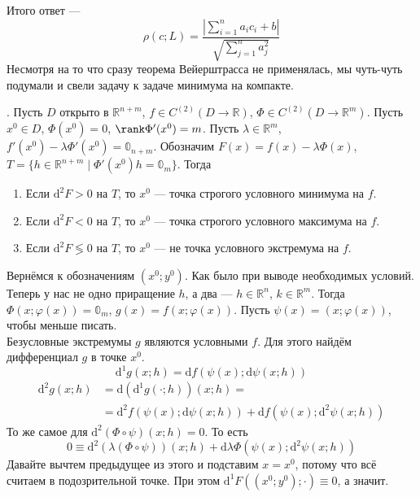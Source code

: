 \documentclass{article}
\begin{document}
\begin{itemize}
\begin{Example}
            Итого ответ ---
            $$
            \rho(c;L)=\frac{\left|\sum\limits_{i=1}^na_ic_i+b\right|}{\sqrt{\sum\limits_{j=1}^na_j^2}}
            $$
            Несмотря на то что сразу теорема Вейерштрасса не применялась, мы чуть-чуть подумали и свели задачу к задаче минимума на компакте.
        \end{Example}
        \thm {}. Пусть $D$ открыто в $\mathbb R^{n+m}$, $f\in C^{(2)}(D\to\mathbb R)$, $\Phi\in C^{(2)}(D\to\mathbb R^m)$. Пусть $x^0\in D$, $\Phi(x^0)=0$, $\rank\Phi'(x^0)=m$. Пусть $\lambda\in\mathbb R^m$, $f'(x^0)-\lambda\Phi'(x^0)=\mathbb0_{n+m}$. Обозначим $F(x)=f(x)-\lambda\Phi(x)$, $T=\{h\in\mathbb R^{n+m}\mid\Phi'(x^0)h=\mathbb0_m\}$. Тогда
        \begin{enumerate}
            \item Если $\mathrm d^2F>0$ на $T$, то $x^0$ --- точка строгого условного минимума на $f$.
            \item Если $\mathrm d^2F<0$ на $T$, то $x^0$ --- точка строгого условного максимума на $f$.
            \item Если $\mathrm d^2F\lessgtr0$ на $T$, то $x^0$ --- не точка условного экстремума на $f$.
        \end{enumerate}
        \begin{Proof}
            Вернёмся к обозначениям $(x^0;y^0)$. Как было при выводе необходимых условий. Теперь у нас не одно приращение $h$, а два --- $h\in\mathbb R^n$, $k\in\mathbb R^m$. Тогда $\Phi(x;\varphi(x))=\mathbb0_m$, $g(x)=f(x;\varphi(x))$. Пусть $\psi(x)=(x;\varphi(x))$, чтобы меньше писать.\\
            Безусловные экстремумы $g$ являются условными $f$. Для этого найдём дифференциал $g$ в точке $x^0$.
            $$
            \mathrm d^1g(x;h)=\mathrm df(\psi(x);\mathrm d\psi(x;h))
            $$
            \[\begin{split}
                \mathrm d^2g(x;h)&=\mathrm d(\mathrm d^1g(\cdot;h))(x;h)=\\
                &=\mathrm d^2f(\psi(x);\mathrm d\psi(x;h))+\mathrm df(\psi(x);\mathrm d^2\psi(x;h))
            \end{split}\]
            То же самое для $\mathrm d^2(\Phi\circ\psi)(x;h)=0$. То есть
            $$
            0\equiv\mathrm d^2(\lambda(\Phi\circ\psi))(x;h)+\mathrm d\lambda\Phi(\psi(x);\mathrm d^2\psi(x;h))
            $$
            Давайте вычтем предыдущее из этого и подставим $x=x^0$, потому что всё считаем в подозрительной точке. При этом $\mathrm d^1F((x^0;y^0);\cdot)\equiv0$, а значит.

\end{Proof}
\end{itemize}
\end{document}
